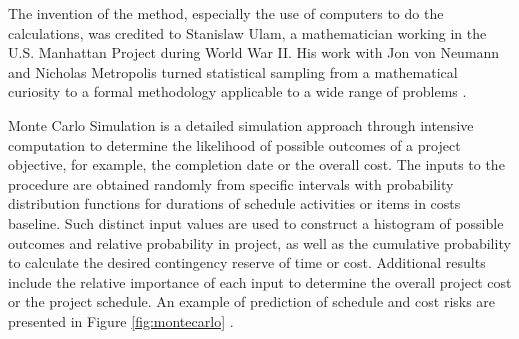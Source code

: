 The invention of the method, especially the use of computers to do the calculations, was credited to Stanislaw Ulam, a mathematician working in the U.S. Manhattan Project during World War II. His work with Jon von Neumann and Nicholas Metropolis turned statistical sampling from a mathematical curiosity to a formal methodology applicable to a wide range of problems \cite{kwak2007exploring}.

Monte Carlo Simulation is a detailed simulation approach through intensive computation to determine the likelihood of possible outcomes of a project objective, for example, the completion date or the overall cost. The inputs to the procedure are obtained randomly from specific intervals with probability distribution functions for durations of schedule activities or items in costs baseline. Such distinct input values are used to construct a histogram of possible outcomes and relative probability in project, as well as the cumulative probability to calculate the desired contingency reserve of time or cost. Additional results include the relative importance of each input to determine the overall project cost or the project schedule. An example of prediction of schedule and cost risks are presented in Figure \ref{fig:montecarlo} \cite{PRACTICESTANDARD2009}.

